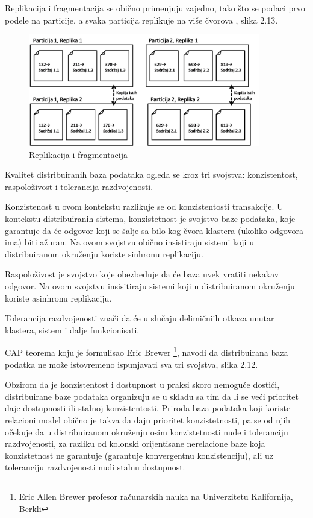 \documentclass[12pt,oneside]{memoir}
\begin{document}
\pagebreak
Replikacija i fragmentacija se obično primenjuju zajedno, tako što se podaci prvo podele na particije, a svaka particija replikuje na više čvorova \cite{ColumnarOriented}, slika 2.13. 

\begin{figure}[!ht]
  \centering
  \includegraphics[width=0.9\textwidth]{replica-partition.png}
  \caption{Replikacija i fragmentacija}
  \label{fig:grafikon}
\end{figure}

Kvalitet distribuiranih baza podataka ogleda se kroz tri svojstva: konzistentost, raspoloživost i tolerancija razdvojenosti.

Konzistenost u ovom kontekstu razlikuje se od konzistentosti transakcije. U kontekstu distribuiranih sistema, konzistetnost je svojstvo baze podataka, koje garantuje da će odgovor koji se šalje sa bilo kog čvora klastera (ukoliko odgovora ima) biti ažuran. Na ovom svojstvu obično insistiraju sistemi koji u distribuiranom okruženju koriste sinhronu replikaciju.

Raspoloživost je svojstvo koje obezbeđuje da će baza uvek vratiti nekakav odgovor. Na ovom svojstvu insisitiraju sistemi koji u distribuiranom okruženju koriste asinhronu replikaciju.

Tolerancija razdvojenosti znači da će u slučaju delimičniih otkaza unutar klastera, sistem i dalje funkcionisati.

CAP teorema koju je formulisao Eric Brewer \footnote{Eric Allen Brewer profesor računarskih nauka na Univerzitetu Kalifornija, Berkli}, navodi da distribuirana baza podatka ne može istovremeno ispunjavati sva tri svojstva, slika 2.12.

Obzirom da je konzistentost i dostupnost u praksi skoro nemoguće dostići, distribuirane baze podataka organizuju se u skladu sa tim da li se veći prioritet daje dostupnosti ili stalnoj konzistentosti. Priroda baza podataka koji koriste relacioni model obično je takva da daju prioritet konzistetnosti, pa se od njih očekuje da u distribuiranom okruženju osim konzistetnosti nude i toleranciju razdvojenosti, za razliku od kolonski orijentisane nerelacione baze koja konzistetnost ne garantuje (garantuje konvergentnu konzistenciju), ali uz toleranciju razdvojenosti nudi stalnu dostupnost.
\end{document}
